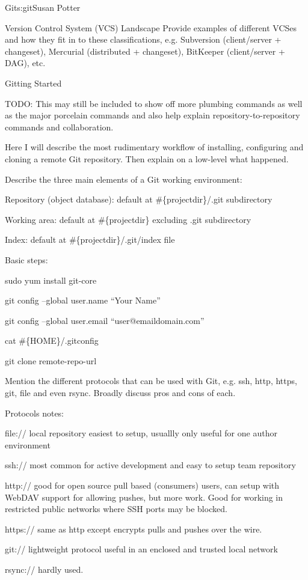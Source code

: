\begin{aosachapter}{Git}{s:git}{Susan Potter}
\begin{aosasect1}{Version Control System (VCS) Landscape}
Provide examples of different VCSes and how they fit in to these
classifications, e.g. Subversion (client/server + changeset), Mercurial
(distributed + changeset), BitKeeper (client/server + DAG), etc.

\end{aosasect1}

\begin{aosasect1}{Gitting Started}

TODO: This may still be included to show off more plumbing commands as well as the major
porcelain commands and also help explain repository-to-repository commands and 
collaboration.

Here I will describe the most rudimentary workflow of installing, configuring
and cloning a remote Git repository. Then explain on a low-level what happened.

Describe the three main elements of a Git working environment:
\begin{aosaitemize}
  \item Repository (object database): default at \#\{projectdir\}/.git subdirectory
  \item Working area: default at \#\{projectdir\} excluding .git subdirectory
  \item Index: default at \#\{projectdir\}/.git/index file
\end{aosaitemize}

Basic steps:
\begin{aosaitemize}
  \item sudo yum install git-core
  \item git config --global user.name ``Your Name''
  \item git config --global user.email ``user@emaildomain.com''
  \item cat \#\{HOME\}/.gitconfig
  \item git clone remote-repo-url
\end{aosaitemize}

Mention the different protocols that can be used with Git, e.g. ssh, http,
https, git, file and even rsync. Broadly discuss pros and cons of each.

Protocols notes:
\begin{aosaitemize}
  \item file:// local repository easiest to setup, usuallly only useful for
    one author environment
  \item ssh:// most common for active development and easy to setup team repository
  \item http:// good for open source pull based (consumers) users, can setup with
    WebDAV support for allowing pushes, but more work. Good for working in
    restricted public networks where SSH ports may be blocked.
  \item https:// same as http except encrypts pulls and pushes over the wire.
  \item git:// lightweight protocol useful in an enclosed and trusted local network
  \item rsync:// hardly used.
\end{aosaitemize}


\end{aosasect1}
\end{aosachapter}
